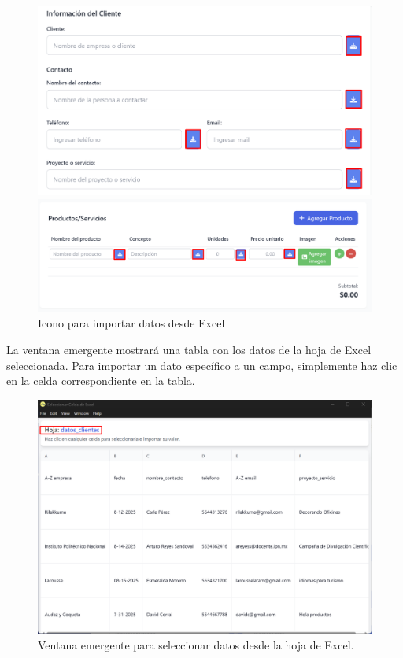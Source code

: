 \documentclass{Pretexto/bluereport}
\begin{document}
\begin{figure}[H]
    \centering
    \begin{minipage}{0.456\linewidth}
        \centering
        \includegraphics[width=\linewidth]{img/llenar_datos_excel.png}
    \end{minipage}
    \begin{minipage}{0.49\linewidth}
        \centering
        \includegraphics[width=\linewidth]{img/registrar_productos_excel.png}
    \end{minipage}

    \caption{Icono para importar datos desde Excel}
    \label{fig:icono-importar}
\end{figure}

La ventana emergente mostrará una tabla con los datos de la hoja de Excel seleccionada.
Para importar un dato específico a un campo, simplemente haz clic en la celda correspondiente en la tabla.
\begin{figure}[H] 
    \centering
        \includegraphics[width=0.6\linewidth]{img/hoja_excel.png}
    \caption{Ventana emergente para seleccionar datos desde la hoja de Excel.}
    \label{fig:seleccionar_hoja}
\end{figure}
\end{document}
